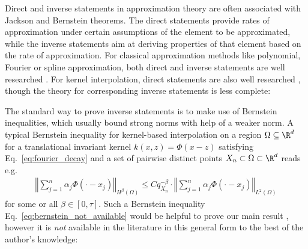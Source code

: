 \documentclass[a4paper, 10pt]{article}
\begin{document}
%
%
%
%
%
%




Direct and inverse statements in approximation theory are often associated with Jackson and Bernstein theorems.
The direct statements provide rates of approximation under certain assumptions of the element to be approximated,
while the inverse statements aim at deriving properties of that element based on the rate of approximation.
For classical approximation methods like polynomial, Fourier or spline approximation,
both direct and inverse statements are well researched \cite{butzer1969fundamental, devore1973saturation}.
For kernel interpolation, direct statements are also well researched \cite{wendland2005approximate, narcowich2006sobolev}, 
%
though the theory for corresponding inverse statements is less complete:

The standard way to prove inverse statements %
is to make use of Bernstein inequalities, 
which usually bound strong norms with help of a weaker norm. %
A typical Bernstein inequality for kernel-based interpolation on a region $\Omega \subseteq \R^d$ for a translational invariant kernel $k(x, z) = \Phi(x-z)$ satisfying Eq.~\eqref{eq:fourier_decay} and a set of pairwise distinct points $X_n \subset \Omega \subset \R^d$ reads e.g.\
\begin{align}
\label{eq:bernstein_not_available}
\left \Vert \sum_{j=1}^n \alpha_j \Phi(\cdot - x_j) \right \Vert_{H^\beta(\Omega)} \leq C q_{X_n}^{-\beta} \cdot \left \Vert \sum_{j=1}^n \alpha_j  \Phi(\cdot - x_j) \right \Vert_{L^2(\Omega)}
\end{align}
for some or all $\beta \in [0, \tau]$.
Such a Bernstein inequality Eq.~\eqref{eq:bernstein_not_available} would be helpful to prove our main result ,
however it is \textit{not} available in the literature in this general form to the best of the author's knowledge:
\end{document}
